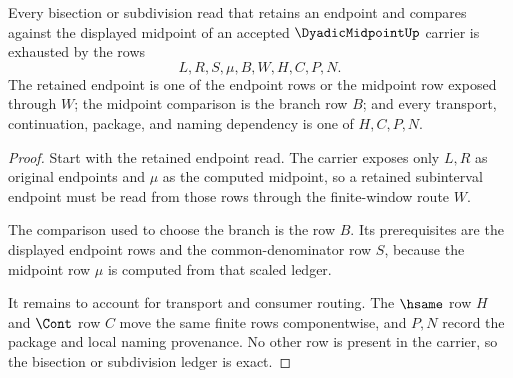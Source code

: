 \begin{theorem}\label{thm:dyadicmidpoint-bisection-ledger-exactness}
Every bisection or subdivision read that retains an endpoint and compares against the displayed midpoint of an accepted $\DyadicMidpointUp$ carrier is exhausted by the rows
$$
L,R,S,\mu,B,W,H,C,P,N.
$$
The retained endpoint is one of the endpoint rows or the midpoint row exposed through $W$; the midpoint comparison is the branch row $B$; and every transport, continuation, package, and naming dependency is one of $H,C,P,N$.
\end{theorem}
\begin{proof}
Start with the retained endpoint read. The carrier exposes only $L,R$ as original endpoints and $\mu$ as the computed midpoint, so a retained subinterval endpoint must be read from those rows through the finite-window route $W$.

The comparison used to choose the branch is the row $B$. Its prerequisites are the displayed endpoint rows and the common-denominator row $S$, because the midpoint row $\mu$ is computed from that scaled ledger.

It remains to account for transport and consumer routing. The $\hsame$ row $H$ and $\Cont$ row $C$ move the same finite rows componentwise, and $P,N$ record the package and local naming provenance. No other row is present in the carrier, so the bisection or subdivision ledger is exact.
\end{proof}

